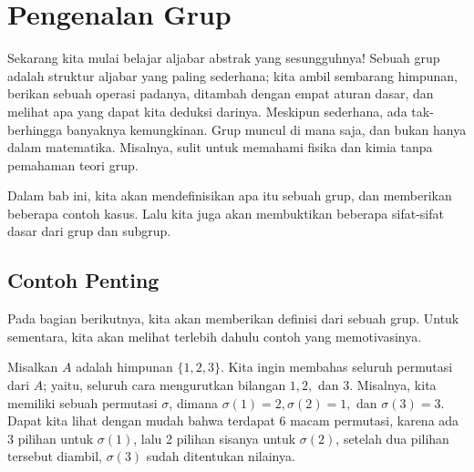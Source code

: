 
\chapter{Pengenalan Grup}

Sekarang kita mulai belajar aljabar abstrak yang sesungguhnya! Sebuah grup adalah struktur aljabar yang paling sederhana; kita ambil sembarang himpunan, berikan sebuah operasi padanya, ditambah dengan empat aturan dasar, dan melihat apa yang dapat kita deduksi darinya. Meskipun sederhana, ada tak-berhingga banyaknya kemungkinan. Grup muncul di mana saja, dan bukan hanya dalam matematika. Misalnya, sulit untuk memahami fisika dan kimia tanpa pemahaman teori grup. 

Dalam bab ini, kita akan mendefinisikan apa itu sebuah grup, dan memberikan beberapa contoh kasus. Lalu kita juga akan membuktikan beberapa sifat-sifat dasar dari grup dan subgrup.

\section{Contoh Penting}

Pada bagian berikutnya, kita akan memberikan definisi dari sebuah grup. Untuk sementara, kita akan melihat terlebih dahulu contoh yang memotivasinya.

Misalkan $A$ adalah himpunan $\{1, 2, 3\}$. Kita ingin membahas seluruh permutasi dari $A$; yaitu, seluruh cara mengurutkan bilangan $1, 2,$ dan $3$. Misalnya, kita memiliki sebuah permutasi $\sigma$, dimana $\sigma(1) = 2, \sigma(2) = 1,$ dan $\sigma(3) = 3$. Dapat kita lihat dengan mudah bahwa terdapat 6 macam permutasi, karena ada 3 pilihan untuk $\sigma(1)$, lalu 2 pilihan sisanya untuk $\sigma(2)$, setelah dua pilihan tersebut diambil, $\sigma(3)$ sudah ditentukan nilainya.

